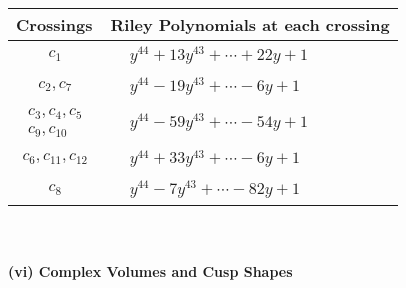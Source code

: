 \documentclass[1p]{elsarticle_modified}
\theoremstyle{definition}
\begin{document}
\begin{tabular}{m{50pt}|m{274pt}}
Crossings & \hspace{64pt}Riley Polynomials at each crossing \\
\hline $$\begin{aligned}c_{1}\end{aligned}$$&$\begin{aligned}
&y^{44}+13 y^{43}+\cdots+22 y+1
\end{aligned}$\\
\hline $$\begin{aligned}c_{2},c_{7}\end{aligned}$$&$\begin{aligned}
&y^{44}-19 y^{43}+\cdots-6 y+1
\end{aligned}$\\
\hline $$\begin{aligned}c_{3},c_{4},c_{5}\\c_{9},c_{10}\end{aligned}$$&$\begin{aligned}
&y^{44}-59 y^{43}+\cdots-54 y+1
\end{aligned}$\\
\hline $$\begin{aligned}c_{6},c_{11},c_{12}\end{aligned}$$&$\begin{aligned}
&y^{44}+33 y^{43}+\cdots-6 y+1
\end{aligned}$\\
\hline $$\begin{aligned}c_{8}\end{aligned}$$&$\begin{aligned}
&y^{44}-7 y^{43}+\cdots-82 y+1
\end{aligned}$\\
\hline
\end{tabular}\\~\\
\newpage\flushleft \textbf{(vi) Complex Volumes and Cusp Shapes}
\end{document}
